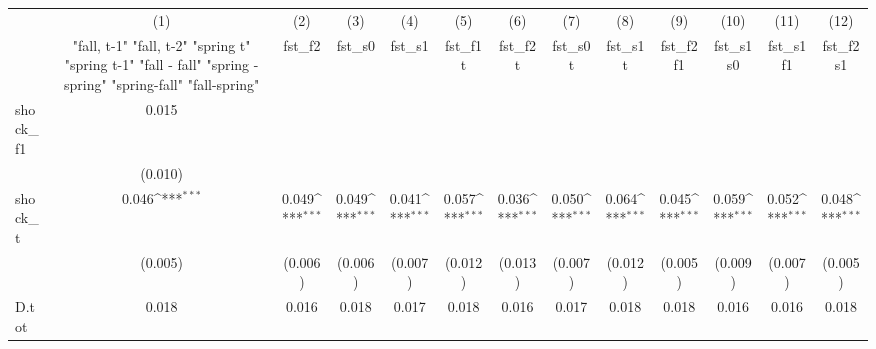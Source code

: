 {
\def\sym#1{\ifmmode^{#1}\else\(^{#1}\)\fi}
\begin{tabular}{l*{12}{c}}
\toprule
            &\multicolumn{1}{c}{(1)}&\multicolumn{1}{c}{(2)}&\multicolumn{1}{c}{(3)}&\multicolumn{1}{c}{(4)}&\multicolumn{1}{c}{(5)}&\multicolumn{1}{c}{(6)}&\multicolumn{1}{c}{(7)}&\multicolumn{1}{c}{(8)}&\multicolumn{1}{c}{(9)}&\multicolumn{1}{c}{(10)}&\multicolumn{1}{c}{(11)}&\multicolumn{1}{c}{(12)}\\
            &\multicolumn{1}{c}{  "fall, t-1" "fall, t-2" "spring t" "spring t-1"  "fall - fall" "spring - spring" "spring-fall" "fall-spring" }&\multicolumn{1}{c}{fst\_f2}&\multicolumn{1}{c}{fst\_s0}&\multicolumn{1}{c}{fst\_s1}&\multicolumn{1}{c}{fst\_f1t}&\multicolumn{1}{c}{fst\_f2t}&\multicolumn{1}{c}{fst\_s0t}&\multicolumn{1}{c}{fst\_s1t}&\multicolumn{1}{c}{fst\_f2f1}&\multicolumn{1}{c}{fst\_s1s0}&\multicolumn{1}{c}{fst\_s1f1}&\multicolumn{1}{c}{fst\_f2s1}\\
\midrule
shock\_f1    &       0.015         &                     &                     &                     &                     &                     &                     &                     &                     &                     &                     &                     \\
            &     (0.010)         &                     &                     &                     &                     &                     &                     &                     &                     &                     &                     &                     \\
\addlinespace
shock\_t     &       0.046\sym{***}&       0.049\sym{***}&       0.049\sym{***}&       0.041\sym{***}&       0.057\sym{***}&       0.036\sym{***}&       0.050\sym{***}&       0.064\sym{***}&       0.045\sym{***}&       0.059\sym{***}&       0.052\sym{***}&       0.048\sym{***}\\
            &     (0.005)         &     (0.006)         &     (0.006)         &     (0.007)         &     (0.012)         &     (0.013)         &     (0.007)         &     (0.012)         &     (0.005)         &     (0.009)         &     (0.007)         &     (0.005)         \\
\addlinespace
D.tot       &       0.018         &       0.016         &       0.018         &       0.017         &       0.018         &       0.016         &       0.017         &       0.018         &       0.018         &       0.016         &       0.016         &       0.018         \\

\end{tabular}}
